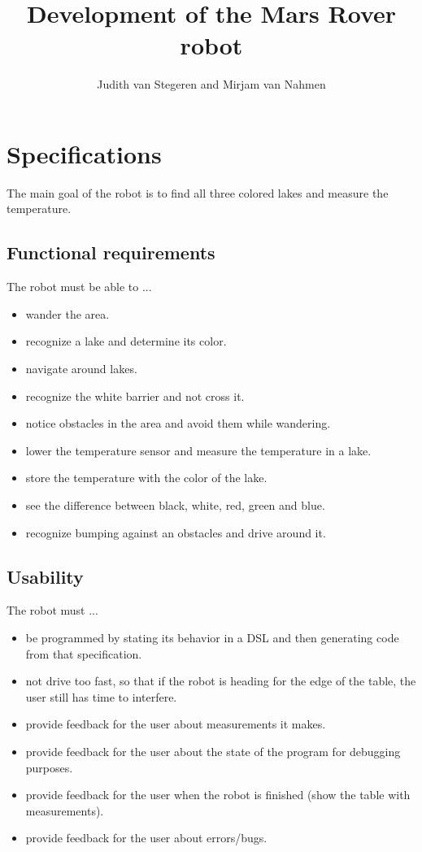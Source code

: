 \documentclass[10pt,a4paper]{article}
\author{Judith van Stegeren and Mirjam van Nahmen}
\title{Development of the Mars Rover robot}
\begin{document}
\maketitle

\section*{Specifications}
The main goal of the robot is to find all three colored lakes and measure the temperature.

\subsection*{Functional requirements}
The robot must be able to ...
\begin{itemize} 
\item wander the area.
\item recognize a lake and determine its color.
\item navigate around lakes.
\item recognize the white barrier and not cross it.
\item notice obstacles in the area and avoid them while wandering.
\item lower the temperature sensor and measure the temperature in a lake.
\item store the temperature with the color of the lake.
\item see the difference between black, white, red, green and blue.
\item recognize bumping against an obstacles and drive around it.
\end{itemize}


\subsection*{Usability}
The robot must ...
\begin{itemize}
\item be programmed by stating its behavior in a DSL and then generating code from that specification.
\item not drive too fast, so that if the robot is heading for the edge of the table, the user still has time to interfere.
\item provide feedback for the user about measurements it makes.
\item provide feedback for the user about the state of the program for debugging purposes.
\item provide feedback for the user when the robot is finished (show the table with measurements).
\item provide feedback for the user about errors/bugs.
\end{itemize}
\end{document}
